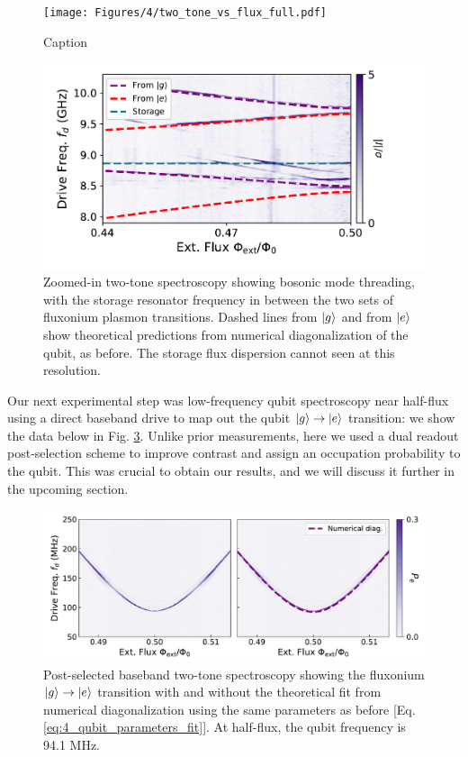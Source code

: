 \begin{figure}[hp]
    \centering
    \texttt{[image: Figures/4/two\_tone\_vs\_flux\_full.pdf]}
    \caption{Caption}
\label{fig:4_two_tone_vs_flux_full}
\end{figure}
\clearpage

\begin{figure}[hp]
    \centering
    \includegraphics[width=0.8\linewidth]{Figures/4/two_tone_vs_flux_zoom.pdf}
    \caption{Zoomed-in two-tone spectroscopy showing bosonic mode threading, with the storage resonator frequency in between the two sets of fluxonium plasmon transitions. Dashed lines from $\lvert g\rangle$ and from $\lvert e\rangle$ show theoretical predictions from numerical diagonalization of the qubit, as before. The storage flux dispersion cannot seen at this resolution.}
\label{fig:4_two_tone_vs_flux_zoom}
\end{figure}

Our next experimental step was low-frequency qubit spectroscopy near half-flux using a direct baseband drive to map out the qubit  $\lvert g\rangle\to\lvert e\rangle$ transition: we show the data below in Fig. \ref{fig:4_qubit_spectroscopy}. Unlike prior measurements, here we used a dual readout post-selection scheme \cite{ding2023FTF} to improve contrast and assign an occupation probability to the qubit. This was crucial to obtain our results, and we will discuss it further in the upcoming section.

\begin{figure}[!b]
    \centering
    \includegraphics[width=0.9\linewidth]{Figures/4/qubit_spectroscopy.pdf}
    \caption{Post-selected baseband two-tone spectroscopy showing the fluxonium $\lvert g\rangle\to\lvert e\rangle$ transition with and without the theoretical fit from numerical diagonalization using the same parameters as before [Eq. \eqref{eq:4_qubit_parameters_fit}]. At half-flux, the qubit frequency is 94.1 MHz.}
\label{fig:4_qubit_spectroscopy}
\end{figure}

